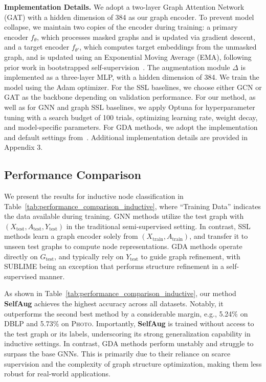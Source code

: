 \documentclass[letterpaper]{article} \usepackage{aaai2026}  \usepackage{times}  \usepackage{helvet}  \usepackage{courier}  \usepackage[hyphens]{url}  \usepackage{graphicx} \urlstyle{rm} \def\UrlFont{\rm}  \usepackage{natbib}  \usepackage{caption} \frenchspacing  \setlength{\pdfpagewidth}{8.5in}  \setlength{\pdfpageheight}{11in}
\begin{document}
\noindent\textbf{Implementation Details.} We adopt a two-layer Graph Attention Network (GAT) with a hidden dimension of 384 as our graph encoder.
To prevent model collapse, we maintain two copies of the encoder during training: a primary encoder \( f_{\theta} \), which processes masked graphs and is updated via gradient descent, and a target encoder \( f_{\theta'} \), which computes target embeddings from the unmasked graph, and is updated using an Exponential Moving Average (EMA), following prior work in bootstrapped self-supervision~\cite{grill2020bootstrap, thakoor2021bootstrapped}.
The augmentation module \( \Delta \) is implemented as a three-layer MLP, with a hidden dimension of 384. We train the model using the Adam optimizer.
For the SSL baselines, we choose either GCN or GAT as the backbone depending on validation performance.
For our method, as well as for GNN and graph SSL baselines, we apply Optuna for hyperparameter tuning with a search budget of 100 trials, optimizing learning rate, weight decay, and model-specific parameters. For GDA methods, we adopt the implementation and default settings from~\cite{li2023gslb}.
Additional implementation details are provided in Appendix 3.

\subsection{Performance Comparison}
\label{sec:comparison}

We present the results for inductive node classification in Table~\ref{tab:performance_comparison_inductive}, where ``Training Data'' indicates the data available during training. GNN methods utilize the test graph with \( (X_{\text{test}}, A_{\text{test}}, Y_{\text{test}}) \) in the traditional semi-supervised setting. In contrast, SSL methods learn a graph encoder solely from \( (X_{\text{train}}, A_{\text{train}}) \), and transfer it to unseen test graphs to compute node representations. GDA methods operate directly on \( G_{\text{test}} \), and typically rely on \( Y_{\text{test}} \) to guide graph refinement, with SUBLIME being an exception that performs structure refinement in a self-supervised manner.

As shown in Table~\ref{tab:performance_comparison_inductive}, our method \textbf{SelfAug} achieves the highest accuracy across all datasets. Notably, it outperforms the second best method by a considerable margin, e.g., 5.24\% on \textsc{DBLP} and 5.73\% on \textsc{Photo}. Importantly, \textbf{SelfAug} is trained without access to the test graph or its labels, underscoring its strong generalization capability in inductive settings.
In contrast, GDA methods perform unstably and struggle to surpass the base GNNs. This is primarily due to their reliance on scarce supervision and the complexity of graph structure optimization, making them less robust for real-world applications.
\end{document}
